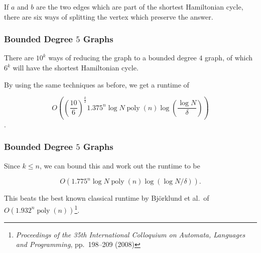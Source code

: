 \documentclass[]{beamer}
\DeclareMathOperator{\poly}{poly}
\begin{document}
\begin{frame}
\begin{center}
\end{center}

If $a$ and $b$ are the two edges which are part of the shortest Hamiltonian cycle, there are six ways of splitting the vertex which preserve the answer.
\end{frame}

\begin{frame}
\frametitle{Bounded Degree $5$ Graphs}
There are $10^k$ ways of reducing the graph to a bounded degree $4$ graph, of which $6^k$ will have the shortest Hamiltonian cycle.

By using the same techniques as before, we get a runtime of

$$O\left(\left(\frac{10}{6}\right)^{\frac{k}{2}}1.375^n\log N\poly(n)\log\left(\frac{\log N}{\delta}\right)\right)$$.
\end{frame}

\begin{frame}
\frametitle{Bounded Degree $5$ Graphs}

Since $k \leq n$, we can bound this and work out the runtime to be

$$O(1.775^n\log N\poly(n)\log(\log N/\delta)).$$

This beats the best known classical runtime by Bj\"orklund et al.\ of $O(1.932^n\poly(n))$\footnote{{\em Proceedings of the 35th International Colloquium on Automata, Languages and Programming}, pp.\ 198--209 (2008)}.
\end{frame}
\end{document}
